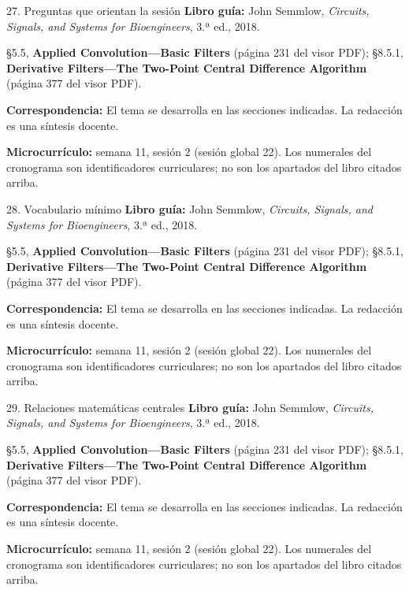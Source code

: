 \documentclass[
  10pt,
  ignorenonframetext,
  aspectratio=169,
  spanish,
]{beamer}
\begin{document}
\begin{frame}{27. Preguntas que orientan la sesión}
\label{preguntas-que-orientan-la-sesiuxf3n-1}
\textbf{Libro guía:} John Semmlow, \emph{Circuits, Signals, and Systems
for Bioengineers}, 3.ª ed., 2018.

§5.5, \textbf{Applied Convolution---Basic Filters} (página 231 del visor
PDF); §8.5.1, \textbf{Derivative Filters---The Two-Point Central
Difference Algorithm} (página 377 del visor PDF).

\textbf{Correspondencia:} El tema se desarrolla en las secciones
indicadas. La redacción es una síntesis docente.

\textbf{Microcurrículo:} semana 11, sesión 2 (sesión global 22). Los
numerales del cronograma son identificadores curriculares; no son los
apartados del libro citados arriba.
\end{frame}

\begin{frame}{28. Vocabulario mínimo}
\label{vocabulario-muxednimo-1}
\textbf{Libro guía:} John Semmlow, \emph{Circuits, Signals, and Systems
for Bioengineers}, 3.ª ed., 2018.

§5.5, \textbf{Applied Convolution---Basic Filters} (página 231 del visor
PDF); §8.5.1, \textbf{Derivative Filters---The Two-Point Central
Difference Algorithm} (página 377 del visor PDF).

\textbf{Correspondencia:} El tema se desarrolla en las secciones
indicadas. La redacción es una síntesis docente.

\textbf{Microcurrículo:} semana 11, sesión 2 (sesión global 22). Los
numerales del cronograma son identificadores curriculares; no son los
apartados del libro citados arriba.
\end{frame}

\begin{frame}{29. Relaciones matemáticas centrales}
\label{relaciones-matemuxe1ticas-centrales-1}
\textbf{Libro guía:} John Semmlow, \emph{Circuits, Signals, and Systems
for Bioengineers}, 3.ª ed., 2018.

§5.5, \textbf{Applied Convolution---Basic Filters} (página 231 del visor
PDF); §8.5.1, \textbf{Derivative Filters---The Two-Point Central
Difference Algorithm} (página 377 del visor PDF).

\textbf{Correspondencia:} El tema se desarrolla en las secciones
indicadas. La redacción es una síntesis docente.

\textbf{Microcurrículo:} semana 11, sesión 2 (sesión global 22). Los
numerales del cronograma son identificadores curriculares; no son los
apartados del libro citados arriba.
\end{frame}
\end{document}
